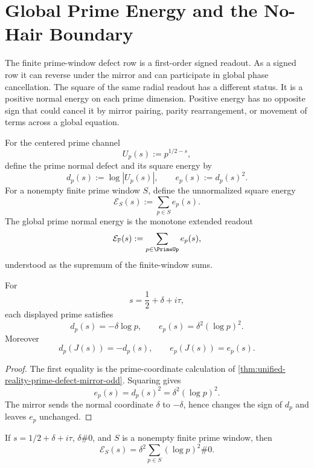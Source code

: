 \section{Global Prime Energy and the No-Hair Boundary}
\label{sec:unified-reality-global-prime-energy-no-hair-boundary}

The finite prime-window defect row is a first-order signed readout.  As a
signed row it can reverse under the mirror and can participate in global
phase cancellation.  The square of the same radial readout has a
different status.  It is a positive normal energy on each prime
dimension.  Positive energy has no opposite sign that could cancel it by
mirror pairing, parity rearrangement, or movement of terms across a
global equation.

\begin{definition}
\label{def:unified-reality-prime-normal-square-energy}
For the centered prime channel
$$
U_p(s):=p^{1/2-s},
$$
define the prime normal defect and its square energy by
$$
d_p(s):=\log |U_p(s)|,
\qquad
e_p(s):=d_p(s)^2.
$$
For a nonempty finite prime window $S$, define the unnormalized square
energy
$$
\mathcal E_S(s):=\sum_{p\in S}e_p(s).
$$
The global prime normal energy is the monotone extended readout
$$
\mathcal E_{\mathbb P}(s)
:=
\sum_{p\in\PrimeUp}e_p(s),
$$
understood as the supremum of the finite-window sums.
\end{definition}

\begin{theorem}
\label{thm:unified-reality-prime-square-energy-mirror-even}
For
$$
s=\frac12+\delta+i\tau,
$$
each displayed prime satisfies
$$
d_p(s)=-\delta\log p,
\qquad
e_p(s)=\delta^2(\log p)^2.
$$
Moreover
$$
d_p(J(s))=-d_p(s),
\qquad
e_p(J(s))=e_p(s).
$$
\end{theorem}

\begin{proof}
The first equality is the prime-coordinate calculation of
\autoref{thm:unified-reality-prime-defect-mirror-odd}.  Squaring gives
$$
e_p(s)=d_p(s)^2=\delta^2(\log p)^2.
$$
The mirror sends the normal coordinate $\delta$ to $-\delta$, hence
changes the sign of $d_p$ and leaves $e_p$ unchanged.
\end{proof}

\begin{theorem}
\label{thm:unified-reality-finite-prime-square-energy-positive-off-half}
If $s=1/2+\delta+i\tau$, $\delta\#0$, and $S$ is a nonempty finite prime
window, then
$$
\mathcal E_S(s)
=
\delta^2\sum_{p\in S}(\log p)^2
\#0.
$$
\end{theorem}

